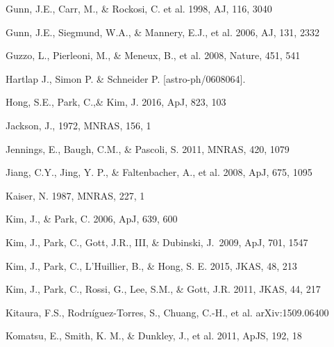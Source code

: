 \documentclass[useAMS,usenatbib]{mnras}
\begin{document}
\begin{thebibliography}{}



Gunn, J.E., Carr, M., \& Rockosi, C. et al. 1998, AJ, 116, 3040

Gunn, J.E., Siegmund, W.A., \& Mannery, E.J., et al. 2006, AJ, 131, 2332

Guzzo, L., Pierleoni, M., \& Meneux, B., et al. 2008, Nature, 451, 541

Hartlap J., Simon P. \& Schneider P. [astro-ph/0608064].


Hong, S.E., Park, C.,\&  Kim, J. 2016, ApJ, 823, 103

Jackson, J., 1972, MNRAS, 156, 1

Jennings, E., Baugh, C.M., \& Pascoli, S. 2011, MNRAS, 420, 1079  


Jiang, C.Y., Jing, Y. P., \& Faltenbacher, A., et al. 2008, ApJ, 675, 1095

Kaiser, N. 1987, MNRAS, 227, 1


Kim, J., \& Park, C. 2006, ApJ, 639, 600  

Kim, J., Park, C., Gott, J.R., III, \& Dubinski, J.\ 2009, ApJ, 701, 1547 

Kim, J., Park, C., L'Huillier, B., \& Hong, S. E. 2015, JKAS, 48, 213

Kim, J., Park, C., Rossi, G., Lee, S.M., \& Gott, J.R. 2011, JKAS, 44, 217  

Kitaura, F.S., Rodrı\'{i}guez-Torres, S., Chuang, C.-H., et al. arXiv:1509.06400

Komatsu, E., Smith, K. M., \& Dunkley, J., et al. 2011, ApJS, 192, 18  


\end{thebibliography}
\end{document}
